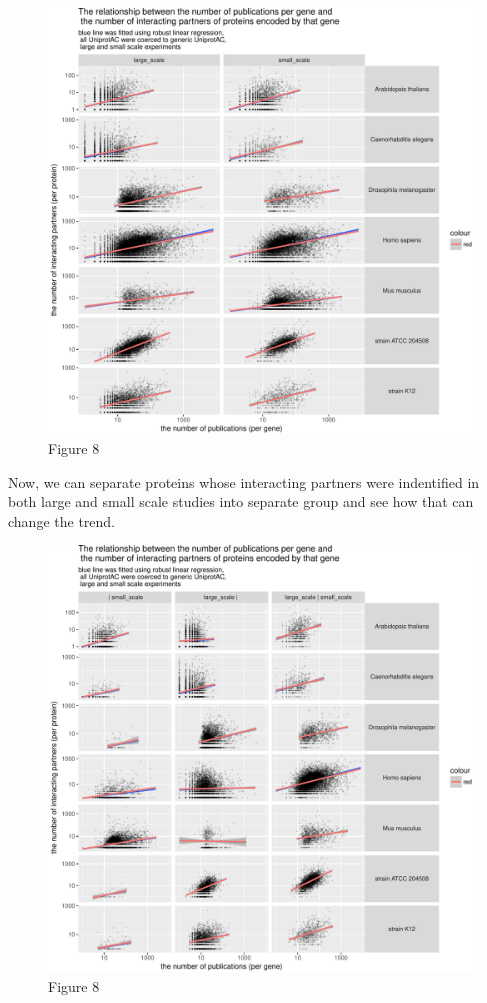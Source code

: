 \documentclass[]{article}
\begin{document}
\begin{figure}[htbp]
\centering
\includegraphics{final_report_files/figure-latex/N_publications_vs_N_interactions_2groups-1.pdf}
\caption{Figure 8}
\end{figure}

Now, we can separate proteins whose interacting partners were
indentified in both large and small scale studies into separate group
and see how that can change the trend.

\begin{figure}[htbp]
\centering
\includegraphics{final_report_files/figure-latex/N_publications_vs_N_interactions_3groups2-1.pdf}
\caption{Figure 8}
\end{figure}
\end{document}
